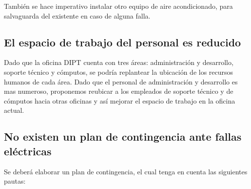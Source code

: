 \documentclass[a4paper,11pt,oneside]{article}
\begin{document}
También se hace imperativo instalar otro equipo de aire acondicionado,
para salvaguarda del existente en caso de alguna falla.
%
\subsection*{El espacio de trabajo del personal es reducido}
Dado que la oficina DIPT cuenta con tres áreas: administración y
desarrollo, soporte técnico y cómputos, se podría replantear la
ubicación de los recursos humanos de cada área. Dado que el personal
de administración y desarrollo es mas numeroso, proponemos reubicar a
los empleados de soporte técnico y de cómputos hacia otras oficinas y
así mejorar el espacio de trabajo en la oficina actual.
%
\subsection*{No existen un plan de contingencia ante fallas eléctricas}
Se deberá elaborar un plan de contingencia, el cual tenga en cuenta las siguientes pautas:
\end{document}

